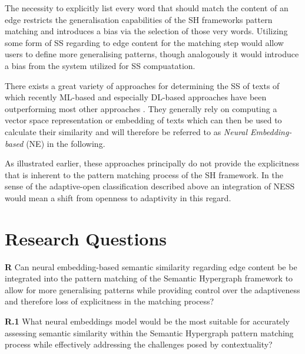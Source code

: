\documentclass[11pt]{scrreprt}
\let\cite\parencite  %
\begin{document}
The necessity to explicitly list every word that should match the content of an edge restricts the generalisation capabilities of the SH frameworks pattern matching and introduces a bias via the selection of those very words. Utilizing some form of SS regarding to edge content for the matching step would allow users to define more generalising patterns, though analogously it would introduce a bias from the system utilized for SS compuatation. 

There exists a great variety of approaches for determining the SS of texts of which recently ML-based and especially DL-based approaches have been outperforming most other approaches \cite{chandrasekaranEvolutionSemanticSimilarity2021}. They generally rely on computing a vector space representation or embedding of texts which can then be used to calculate their similarity and will therefore be referred to as \textit{Neural Embedding-based} (NE) in the following. 

As illustrated earlier, these approaches principally do not provide the explicitness that is inherent to the pattern matching process of the SH framework. In the sense of the adaptive-open classification described above an integration of NESS would mean a shift from openness to adaptivity in this regard.



\section{Research Questions}

\textbf{R} Can neural embedding-based semantic similarity regarding edge content be be integrated into the pattern matching of the Semantic Hypergraph framework to allow for more generalising patterns while providing control over the adaptiveness and therefore loss of explicitness in the matching process?

\textbf{R.1} What neural embeddings model would be the most suitable for accurately assessing semantic similarity within the Semantic Hypergraph pattern matching process while effectively addressing the challenges posed by contextuality?
\end{document}
